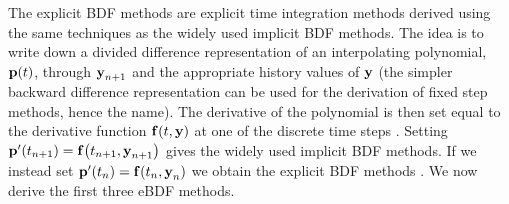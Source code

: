 The explicit BDF methods are explicit time integration methods derived using the same techniques as the widely used implicit BDF methods.
The idea is to write down a divided difference representation of an interpolating polynomial, ${\boldsymbol{\mathrm{p}}}(t)$, through $\boldsymbol{\mathrm{y}}_{n+1}$ and the appropriate history values of $\boldsymbol{\mathrm{y}}$ (the simpler backward difference representation can be used for the derivation of fixed step methods, hence the name).
The derivative of the polynomial is then set equal to the derivative function ${\boldsymbol{\mathrm{f}}{\left( t, \boldsymbol{\mathrm{y}} \right)}}$ at one of the discrete time steps \cite[400]{HairerNorsettWanner}.
Setting ${\boldsymbol{\mathrm{p}}}'(t_{n+1}) = {\boldsymbol{\mathrm{f}}{\left( t_{n+1}, \boldsymbol{\mathrm{y}}_{n+1} \right)}}$ gives the widely used implicit BDF methods.
If we instead set ${\boldsymbol{\mathrm{p}}}'(t_{n}) = {\boldsymbol{\mathrm{f}}{\left( t_{n}, \boldsymbol{\mathrm{y}}_{n} \right)}}$ we obtain the explicit BDF methods \cite[364]{HairerNorsettWanner}.
We now derive the first three eBDF methods.

